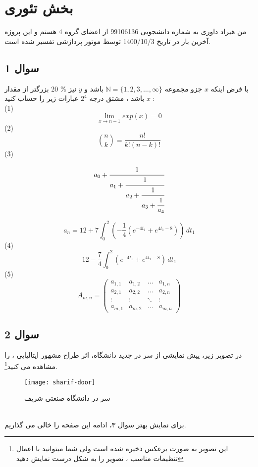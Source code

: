 \documentclass[twoside]{article}
\newcommand{\نام}{هیراد داوری}
\newcommand{\StudentID}{99106136}
\newcommand{\گروه}{4}
\newcommand{\CompileDate}{1400/10/3}
\begin{document}
\maketitlebox
\section*{بخش تئوری}

من \نام{} به شماره دانشجویی \StudentID{} از اعضای گروه \گروه{} هستم و این پروژه آخرین بار در تاریخ \CompileDate{}
توسط موتور پردازشی \XeLaTeX تفسیر شده است.



\subsection*{سوال 1}
با فرض اینکه  $x$ جزو مجموعه  $\mathbb{N} = \{1,2,3,\dots ,\infty\}$ باشد و $y$  نیز $\%$ 20 بزرگتر از مقدار $x$\hspace{1pt} باشد ، مشتق 
درجه $2^4$ عبارات زیر را حساب کنید :
\\

(1)
$$ \lim_{x\to{n-1}}exp(x)=0 $$
(2)
\[
    \binom{n}{k} = \frac{n!}{k!(n-k)!}
\]
(3)

\[
  a_0+\cfrac{1}{a_1+\cfrac{1}{a_2+\cfrac{1}{a_3+\cfrac{1}{a_4}}}}
\]

$$a_n=12+7 \int_0^2(-\frac{1}{4}(e^{-4t_1}+e^{4t_1-8}))\,dt_1$$
(4)
$$12-\frac{7}{4}\int_0^2(e^{-4t_1}+e^{4t_1-8})\,dt_1$$
(5)
\[
A_{m,n}= \begin{pmatrix} 
    a_{1,1} & a_{1,2} & \dots &a_{1,n}\\
    a_{2,1} & a_{2,2} & \dots &a_{2,n}\\
    \vdots & \vdots &\ddots & \vdots \\
    a_{m,1} &a_{m,2} & \dots  & a_{m,n} 
    \end{pmatrix}
\]

\subsection*{سوال 2}
در تصویر زیر، پیش نمایشی از سر در جدید دانشگاه، اثر طراح مشهور ایتالیایی ، را مشاهده می کنید\footnote{این تصویر به صورت برعکس ذخیره شده است ولی شما میتوانید با اعمال تنظیمات مناسب ، تصویر را به شکل درست نمایش دهید}.
\begin{figure}[h]
\begin{center}
\texttt{[image: sharif-door]}
\caption{سر در دانشگاه صنعتی شریف}
\label{my label}
\end{center}
\end{figure} 
\\ 
برای نمایش بهتر سوال ۳، ادامه این صفحه را خالی می گذاریم.
\newpage
\end{document}
